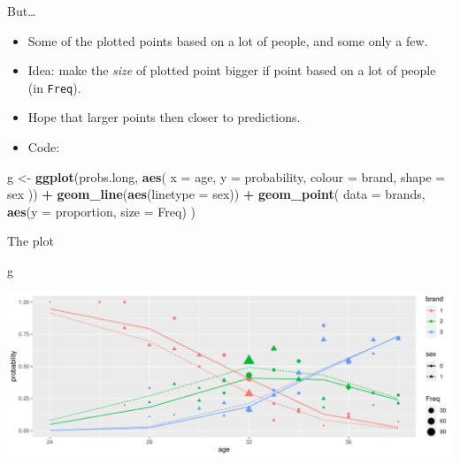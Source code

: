 \documentclass[
  ignorenonframetext,
]{beamer}
\newenvironment{Shaded}{\begin{snugshade}}{\end{snugshade}}
\newcommand{\DataTypeTok}[1]{\textcolor[rgb]{0.13,0.29,0.53}{#1}}
\newcommand{\KeywordTok}[1]{\textcolor[rgb]{0.13,0.29,0.53}{\textbf{#1}}}
\newcommand{\NormalTok}[1]{#1}
\newcommand{\OperatorTok}[1]{\textcolor[rgb]{0.81,0.36,0.00}{\textbf{#1}}}
\newcommand{\StringTok}[1]{\textcolor[rgb]{0.31,0.60,0.02}{#1}}
\begin{document}
\begin{frame}[fragile]{But\ldots}
\protect\hypertarget{but-1}{}

\begin{itemize}
\item
  Some of the plotted points based on a lot of people, and some only a
  few.
\item
  Idea: make the \emph{size} of plotted point bigger if point based on a
  lot of people (in \texttt{Freq}).
\item
  Hope that larger points then closer to predictions.
\item
  Code:
\end{itemize}

\footnotesize

\begin{Shaded}
\begin{Highlighting}[]
\NormalTok{g <-}\StringTok{ }\KeywordTok{ggplot}\NormalTok{(probs.long, }\KeywordTok{aes}\NormalTok{(}
  \DataTypeTok{x =}\NormalTok{ age, }\DataTypeTok{y =}\NormalTok{ probability,}
  \DataTypeTok{colour =}\NormalTok{ brand, }\DataTypeTok{shape =}\NormalTok{ sex}
\NormalTok{)) }\OperatorTok{+}
\StringTok{  }\KeywordTok{geom_line}\NormalTok{(}\KeywordTok{aes}\NormalTok{(}\DataTypeTok{linetype =}\NormalTok{ sex)) }\OperatorTok{+}
\StringTok{  }\KeywordTok{geom_point}\NormalTok{(}
    \DataTypeTok{data =}\NormalTok{ brands,}
    \KeywordTok{aes}\NormalTok{(}\DataTypeTok{y =}\NormalTok{ proportion, }\DataTypeTok{size =}\NormalTok{ Freq)}
\NormalTok{  )}
\end{Highlighting}
\end{Shaded}

\normalsize

\end{frame}

\begin{frame}[fragile]{The plot}
\protect\hypertarget{the-plot-3}{}

\begin{Shaded}
\begin{Highlighting}[]
\NormalTok{g}
\end{Highlighting}
\end{Shaded}

\includegraphics{slides_d29_files/figure-beamer/unnamed-chunk-149-1.pdf}

\end{frame}
\end{document}
